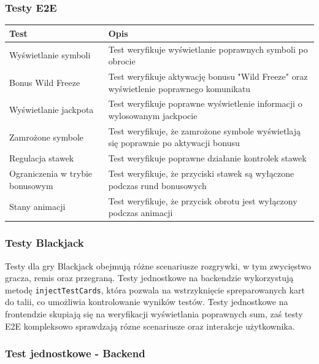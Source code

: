 \documentclass[a4paper,12pt]{article}
\begin{document}
\subsubsection*{Testy E2E}
\begin{tabularx}{\textwidth}{lX}
\toprule
\textbf{Test} & \textbf{Opis} \\
\midrule
Wyświetlanie symboli & Test weryfikuje wyświetlanie poprawnych symboli po obrocie \\
Bonus Wild Freeze & Test weryfikuje aktywację bonusu "Wild Freeze" oraz wyświetlenie poprawnego komunikatu \\
Wyświetlanie jackpota & Test weryfikuje poprawne wyświetlenie informacji o wylosowanym jackpocie \\
Zamrożone symbole & Test weryfikuje, że zamrożone symbole wyświetlają się poprawnie po aktywacji bonusu \\
Regulacja stawek & Test weryfikuje poprawne działanie kontrolek stawek \\
Ograniczenia w trybie bonusowym & Test weryfikuje, że przyciski stawek są wyłączone podczas rund bonusowych \\
Stany animacji & Test weryfikuje, że przycisk obrotu jest wyłączony podczas animacji \\
\bottomrule
\end{tabularx}


\subsubsection{Testy Blackjack}
Testy dla gry Blackjack obejmują różne scenariusze rozgrywki, w tym zwycięstwo gracza, remis oraz przegraną. Testy jednostkowe na backendzie wykorzystują metodę \texttt{injectTestCards}, która pozwala na wstrzyknięcie spreparowanych kart do talii, co umożliwia kontrolowanie wyników testów. Testy jednostkowe na frontendzie skupiają się na weryfikacji wyświetlania poprawnych sum, zaś testy E2E kompleksowo sprawdzają rózne scenariusze oraz interakcje użytkownika.

\subsubsection*{Test jednostkowe - Backend}
\end{document}
